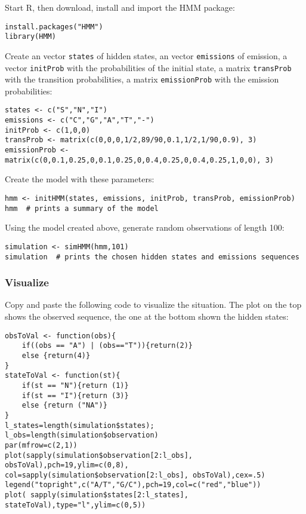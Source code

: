 \documentclass[a4paper,11pt]{article}
\begin{document}
Start R, then download, install and import the HMM package:

\begin{verbatim}
install.packages("HMM")
library(HMM)
\end{verbatim}

Create an vector \texttt{states} of hidden states, an vector \texttt{emissions} of emission, a vector \texttt{initProb} with the probabilities of the initial state, a matrix \texttt{transProb} with the transition probabilities, a matrix \texttt{emissionProb} 
with the emission probabilities:

\begin{verbatim}
states <- c("S","N","I")
emissions <- c("C","G","A","T","-")
initProb <- c(1,0,0)
transProb <- matrix(c(0,0,0,1/2,89/90,0.1,1/2,1/90,0.9), 3)
emissionProb <- matrix(c(0,0.1,0.25,0,0.1,0.25,0,0.4,0.25,0,0.4,0.25,1,0,0), 3)
\end{verbatim}

Create the model with these parameters:

\begin{verbatim}
hmm <- initHMM(states, emissions, initProb, transProb, emissionProb)
hmm  # prints a summary of the model
\end{verbatim}

Using the model created above, generate random observations of length 100:
\begin{verbatim}
simulation <- simHMM(hmm,101)
simulation  # prints the chosen hidden states and emissions sequences
\end{verbatim}

\subsubsection{Visualize}\label{plot}

Copy and paste the following code to visualize the situation. The plot on the top shows the observed sequence,
the one at the bottom shown the hidden states:

\begin{verbatim}
obsToVal <- function(obs){
	if((obs == "A") | (obs=="T")){return(2)}
	else {return(4)}
}
stateToVal <- function(st){
	if(st == "N"){return (1)}
	if(st == "I"){return (3)}
	else {return ("NA")}
}
l_states=length(simulation$states); l_obs=length(simulation$observation) 
par(mfrow=c(2,1))
plot(sapply(simulation$observation[2:l_obs], obsToVal),pch=19,ylim=c(0,8),
col=sapply(simulation$observation[2:l_obs], obsToVal),cex=.5)
legend("topright",c("A/T","G/C"),pch=19,col=c("red","blue"))
plot( sapply(simulation$states[2:l_states], stateToVal),type="l",ylim=c(0,5))
\end{verbatim}
\end{document}
